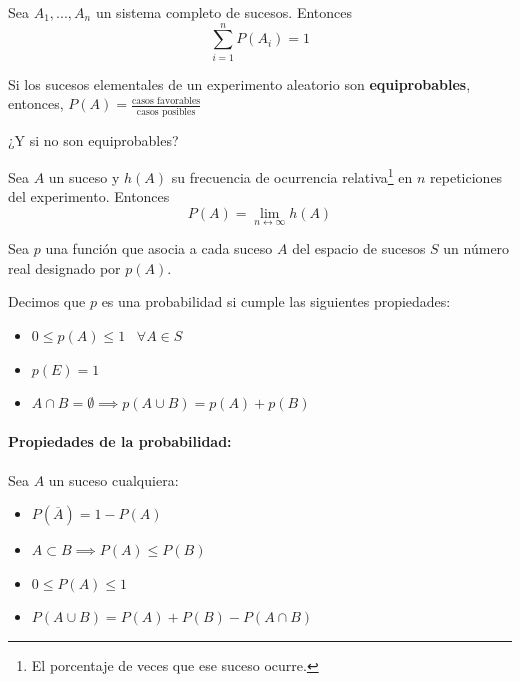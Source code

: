 \begin{prop}Sea $A_1,...,A_n$ un sistema completo de sucesos. Entonces \[\displaystyle\sum_{i=1}^n P(A_i) = 1\]
\end{prop}


\begin{defn}
Si los sucesos elementales de un experimento aleatorio son \textbf{equiprobables}, entonces, $P(A) = \frac{\text{casos favorables}}{\text{casos posibles}}$
\end{defn}
\obs ¿Y si no son equiprobables? 

\begin{defn}
Sea $A$ un suceso y $h(A)$ su frecuencia de ocurrencia relativa\footnote{El porcentaje de veces que ese suceso ocurre.} en $n$ repeticiones del experimento. Entonces \[P(A) = \lim_{n\leftrightarrow \infty}h(A)\]
\end{defn}


\begin{defn}
    Sea $p$ una función que asocia a cada suceso $A$ del espacio de sucesos $S$ un número real designado por $p(A)$.
    
    Decimos que $p$ es una probabilidad si cumple las siguientes propiedades:
    \begin{itemize}
        \item $0\leq p(A) \leq 1 \;\;\;\forall A\in S$
        \item $p(E) = 1$
        \item $A\cap B = \emptyset \implies p(A\cup B) = p(A) + p(B)$
    \end{itemize}
\end{defn}

\paragraph{Propiedades de la probabilidad:} Sea $A$ un suceso cualquiera:
\begin{itemize}
    \item $P(\overline{A}) = 1 - P(A)$
    \item $A\subset B \implies P(A) \leq P(B)$
    \item $0\leq P(A) \leq 1$
    \item $P(A\cup B) = P(A) + P(B) - P(A\cap B)$
\end{itemize}

